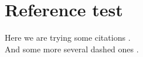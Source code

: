 \documentclass[float=false, crop=false]{standalone}
\begin{document}
\section{Reference test}\label{sec:reftest}
Here we are trying some citations \cite{ruvalcaba:2019ab}.\newline~\\
And some more several dashed ones \cite{Phillips:2017iha,ruvalcaba:2019ab,Phalen:2016hl}.
\end{document}
